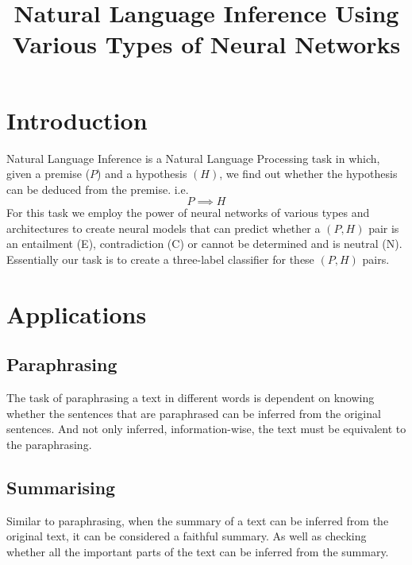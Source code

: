 \documentclass[12pt, conference]{IEEEtran}
\begin{document}
\title{Natural Language Inference Using Various Types of Neural Networks}

\author{
\and
{}
\and
{}
}

\maketitle

\section{Introduction}
Natural Language Inference is a Natural Language Processing task in which, given a premise ($P$) and a hypothesis $(H)$, we find out whether the hypothesis can be deduced from the premise. i.e.\\
$$
P \implies H
$$
For this task we employ the power of neural networks of various types and architectures to create neural models that can predict whether a $(P, H)$ pair is an entailment (E), contradiction (C) or cannot be determined and is neutral (N).\\
Essentially our task is to create a three-label classifier for these $(P, H)$ pairs.\\

\section{Applications}

\subsection{Paraphrasing}
The task of paraphrasing a text in different words is dependent on knowing whether the sentences that are paraphrased can be inferred from the original sentences. And not only inferred, information-wise, the text must be equivalent to the paraphrasing.

\subsection{Summarising}
Similar to paraphrasing, when the summary of a text can be inferred from the original text, it can be considered a faithful summary. As well as checking whether all the important parts of the text can be inferred from the summary. 
\end{document}
